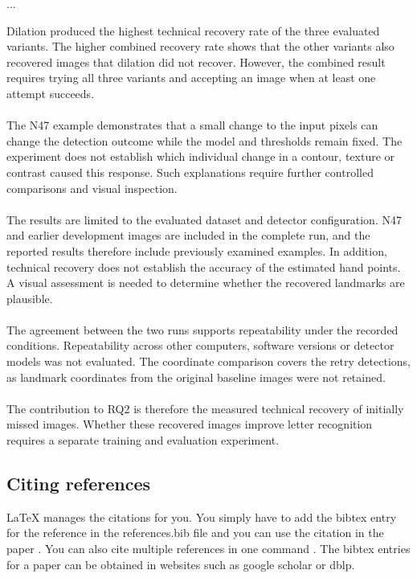 \documentclass{article}
\begin{document}
\par\noindent ...\par\medskip
        Dilation produced the highest technical recovery rate of the three evaluated variants. The higher combined recovery rate shows that the other variants also recovered images that dilation did not recover. However, the combined result requires trying all three variants and accepting an image when at least one attempt succeeds.
        \\\\
        The N47 example demonstrates that a small change to the input pixels can change the detection outcome while the model and thresholds remain fixed. The experiment does not establish which individual change in a contour, texture or contrast caused this response. Such explanations require further controlled comparisons and visual inspection.
        \\\\
        The results are limited to the evaluated dataset and detector configuration. N47 and earlier development images are included in the complete run, and the reported results therefore include previously examined examples. In addition, technical recovery does not establish the accuracy of the estimated hand points. A visual assessment is needed to determine whether the recovered landmarks are plausible.
        \\\\
        The agreement between the two runs supports repeatability under the recorded conditions. Repeatability across other computers, software versions or detector models was not evaluated. The coordinate comparison covers the retry detections, as landmark coordinates from the original baseline images were not retained.
        \\\\
        The contribution to RQ2 is therefore the measured technical recovery of initially missed images. Whether these recovered images improve letter recognition requires a separate training and evaluation experiment.
        
\iffalse
    \subsection{Citing references}
        LaTeX manages the citations for you. You simply have to add the bibtex entry for the reference in the references.bib file and you can use the citation in the paper \cite{langley00}. You can also cite multiple references in one command \cite{DudaHart2nd,Newell81,kearns89}. The bibtex entries for a paper can be obtained in websites such as google scholar or dblp.
        
\end{document}

